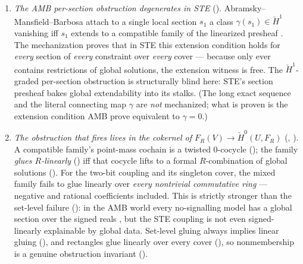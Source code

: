 \documentclass[11pt]{article}
\newcommand{\Hech}{\check H}
\begin{document}
\begin{enumerate}
\item \emph{The AMB per-section obstruction degenerates in STE}
  ().  Abramsky--Mansfield--Barbosa
  attach to a single local section $s_1$ a class $\gamma(s_1) \in
  \Hech^1$ vanishing iff $s_1$ extends to a compatible family of the
  linearized presheaf \citep[Prop.~4.2]{abramsky2012cohomology}.
  The mechanization proves that in STE this extension condition
  holds for \emph{every} section of \emph{every} constraint over
  \emph{every} cover --- because  only ever
  contains restrictions of global solutions, the extension witness
  is free.  The $\Hech^1$-graded per-section obstruction is
  structurally blind here: STE's section presheaf bakes global
  extendability into its stalks.  (The long exact sequence and the
  literal connecting map $\gamma$ are \emph{not} mechanized; what is
  proven is the extension condition AMB prove equivalent to $\gamma
  = 0$.)
\item \emph{The obstruction that fires lives in the cokernel of
  $F_R(V) \to \Hech^0(U, F_R)$}
  (,
  ).  A compatible
  family's point-mass cochain is a twisted $0$-cocycle
  (); the family \emph{glues
  $R$-linearly} () iff that cocycle lifts to a
  formal $R$-combination of global solutions
  ().  For the two-bit coupling
  and its singleton cover, the mixed family fails to glue linearly
  over \emph{every nontrivial commutative ring} --- negative and
  rational coefficients included.  This is strictly stronger than
  the set-level failure (): in the AMB
  world every no-signalling model has a global section over the
  signed reals \citep{abramsky2011sheaf}, but the STE coupling is
  not even signed-linearly explainable by global data.  Set-level
  gluing always implies linear gluing
  (), and rectangles glue linearly
  over every cover (), so
  nonmembership is a genuine obstruction invariant
  ().
\end{enumerate}
\end{document}
